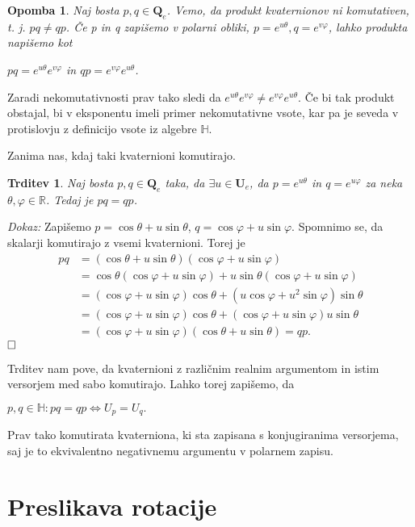 \documentclass[a4paper,12pt]{article}
\def\R{\mathbb{R}} %
\def\H{\mathbb{H}} %
\def\Qe{\textbf{Q}_{e}} %
\def\Ue{\textbf{U}_{e}} %
\def\qed{$\hfill\Box$}   %
\newtheorem{trditev}{Trditev}
\newtheorem{opomba}{Opomba}
\begin{document}
\begin{opomba} 
Naj bosta $p,q \in \Qe$. Vemo, da produkt kvaternionov ni komutativen, t. j. $p q \neq q p$. Če p in q zapišemo v polarni obliki, 
$p = e^{u\theta}, q = e^{v\varphi}$, lahko produkta napišemo kot
\begin{center}
   $p q = e^{u\theta} e^{v\varphi}$ in $q p = e^{v\varphi}e^{u\theta}$.
\end{center}
\end{opomba}
Zaradi nekomutativnosti prav tako sledi da $e^{u\theta} e^{v\varphi} \neq e^{v\varphi}e^{u\theta}$. Če bi tak produkt obstajal, bi v eksponentu imeli primer nekomutativne vsote,
kar pa je seveda v protislovju z definicijo vsote iz algebre $\H$.


Zanima nas, kdaj taki kvaternioni komutirajo.
\begin{trditev}
Naj bosta $p,q \in \Qe$ taka, da $\exists u \in \Ue$, da $p = e^{u\theta}$ in $q = e^{u\varphi}$ za neka $\theta, \varphi \in \R$.
Tedaj je $pq = qp$.
\end{trditev}
\noindent
{\em Dokaz:\/} Zapišemo $p = \cos\theta + u\sin\theta$, $q = \cos\varphi + u\sin\varphi$.
Spomnimo se, da skalarji komutirajo z vsemi kvaternioni. Torej je
\begin{align*}
   pq & = (\cos\theta + u\sin\theta)(\cos\varphi + u\sin\varphi)\\
   & = \cos\theta(\cos\varphi + u\sin\varphi) + u\sin\theta(\cos\varphi + u\sin\varphi)\\
   & = (\cos\varphi + u\sin\varphi)\cos\theta + (u\cos\varphi + u^2\sin\varphi)\sin\theta\\
   & = (\cos\varphi + u\sin\varphi)\cos\theta + (\cos\varphi + u\sin\varphi)u\sin\theta\\
   & = (\cos\varphi + u\sin\varphi)(\cos\theta + u\sin\theta) = qp.
\end{align*}
\qed

Trditev nam pove, da kvaternioni z različnim realnim argumentom in istim versorjem med sabo komutirajo. Lahko torej zapišemo, da 
\begin{center}
   $p,q \in \H:  pq = qp \iff U_{p} = U_{q}.$
\end{center}
Prav tako komutirata kvaterniona, ki sta zapisana s konjugiranima versorjema, saj je to ekvivalentno negativnemu argumentu v polarnem zapisu.

\section{Preslikava rotacije}
\end{document}
